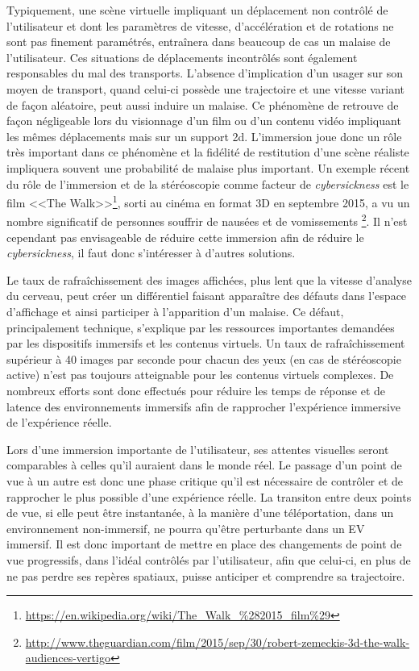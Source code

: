 Typiquement, une scène virtuelle impliquant un déplacement non contrôlé de l'utilisateur et dont les paramètres de vitesse, d'accélération et de rotations ne sont pas finement paramétrés, entraînera dans beaucoup de cas un malaise de l'utilisateur. Ces situations de déplacements incontrôlés sont également responsables du mal des transports. L'absence d'implication d'un usager sur son moyen de transport, quand celui-ci possède une trajectoire et une vitesse variant de façon aléatoire, peut aussi induire un malaise. Ce phénomène de retrouve de façon négligeable lors du visionnage d'un film ou d'un contenu vidéo impliquant les mêmes déplacements mais sur un support 2d. L'immersion joue donc un rôle très important dans ce phénomène et la fidélité de restitution d'une scène réaliste impliquera souvent une probabilité de malaise plus important. Un exemple récent du rôle de l'immersion et de la stéréoscopie comme facteur de \textit{cybersickness} est le film <<The Walk>>\footnote{\url{https://en.wikipedia.org/wiki/The\_Walk\_\%282015\_film\%29}}, sorti au cinéma en format 3D en septembre 2015, a vu un nombre significatif de personnes souffrir de nausées et de vomissements \footnote{\url{http://www.theguardian.com/film/2015/sep/30/robert-zemeckis-3d-the-walk-audiences-vertigo}}. Il n'est cependant pas envisageable de réduire cette immersion afin de réduire le \textit{cybersickness}, il faut donc s'intéresser à d'autres solutions.

Le taux de rafraîchissement des images affichées, plus lent que la vitesse d'analyse du cerveau, peut créer un différentiel faisant apparaître des défauts dans l'espace d'affichage et ainsi participer à l'apparition d'un malaise. Ce défaut, principalement technique, s'explique par les ressources importantes demandées par les dispositifs immersifs et les contenus virtuels. Un taux de rafraîchissement supérieur à 40 images par seconde pour chacun des yeux (en cas de stéréoscopie active) n'est pas toujours atteignable pour les contenus virtuels complexes. De nombreux efforts sont donc effectués pour réduire les temps de réponse et de latence des environnements immersifs afin de rapprocher l'expérience immersive de l'expérience réelle.

Lors d'une immersion importante de l'utilisateur, ses attentes visuelles seront comparables à celles qu'il auraient dans le monde réel. Le passage d'un point de vue à un autre est donc une phase critique qu'il est nécessaire de contrôler et de rapprocher le plus possible d'une expérience réelle. La transiton entre deux points de vue, si elle peut être instantanée, à la manière d'une téléportation, dans un environnement non-immersif, ne pourra qu'être perturbante dans un EV immersif. Il est donc important de mettre en place des changements de point de vue progressifs, dans l'idéal contrôlés par l'utilisateur, afin que celui-ci, en plus de ne pas perdre ses repères spatiaux, puisse anticiper et comprendre sa trajectoire.

